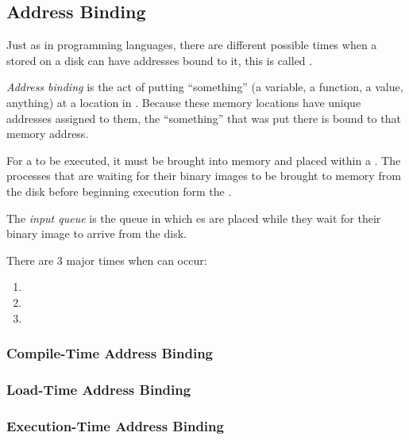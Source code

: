 \subsection{Address Binding}\label{subsec:Address_Binding}
Just as in programming languages, there are different possible times when a  stored on a disk can have  addresses bound to it, this is called .

\begin{definition}\label{def:Address_Binding}
  \emph{Address binding} is the act of putting ``something'' (a variable, a function, a value, anything) at a location in .
  Because these memory locations have unique addresses assigned to them, the ``something'' that was put there is bound to that memory address.
\end{definition}

For a  to be executed, it must be brought into memory and placed within a .
The processes that are waiting for their binary images to be brought to memory from the disk before beginning execution form the .

\begin{definition}\label{def:Input_Queue}
  The \emph{input queue} is the queue in which es are placed while they wait for their  binary image to arrive from the disk.
\end{definition}

There are 3 major times when  can occur:
\begin{enumerate}[noitemsep]
\item {}
\item {}
\item {}
\end{enumerate}

\subsubsection{Compile-Time Address Binding}\label{subsubsec:Compile_Time_Address_Binding}
\subsubsection{Load-Time Address Binding}\label{subsubsec:Load_Time_Address_Binding}
\subsubsection{Execution-Time Address Binding}\label{subsubsec:Execution_Time_Address_Binding}


